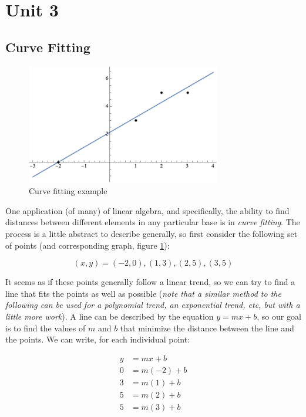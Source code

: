 \documentclass[12pt]{article}
\begin{document}
\section{Unit 3}

\subsection{Curve Fitting}

\begin{figure}[!ht]
    \centering
    \includegraphics[width=8.5cm]{misc/linearregressionexample.png}
    \caption{Curve fitting example}
    \label{fig:curvefitting}
\end{figure}

One application (of many) of linear algebra, and specifically, the ability to find distances between different elements in any particular base is in \textit{curve fitting}. The process is a little abstract to describe generally, so first consider the following set of points (and corresponding graph, figure \ref{fig:curvefitting}):

$$(x,y) = (-2,0), (1,3), (2,5), (3,5)$$

It seems as if these points generally follow a linear trend, so we can try to find a line that fits the points as well as possible (\textit{note that a similar method to the following can be used for a polynomial trend, an exponential trend, etc, but with a little more work}). A line can be described by the equation $y = mx+b$, so our goal is to find the values of $m$ and $b$ that minimize the distance between the line and the points. We can write, for each individual point:

\begin{equation}
    \begin{split}
        y &= mx+b\\
        0 &= m(-2)+b\\
        3 &= m(1)+b\\
        5 &= m(2)+b\\
        5 &= m(3)+b
    \end{split}
\end{equation}
\end{document}
